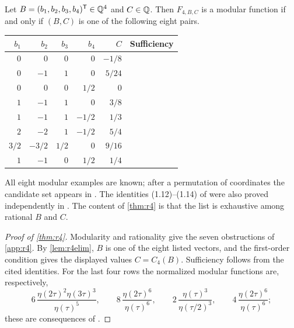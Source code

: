 \begin{theorem}\label{thm:r4}
Let $B=(b_1,b_2,b_3,b_4)^{\mathsf{T}}\in\mathbb{Q}^4$ and $C\in\mathbb{Q}$. Then $F_{4,B,C}$ is a modular function if and only if $(B,C)$ is one of the following eight pairs.
\begin{center}
\begin{tabular}{rrrrrl}
\toprule
$b_1$ & $b_2$ & $b_3$ & $b_4$ & $C$ & Sufficiency\\
\midrule
$0$ & $0$ & $0$ & $0$ & $-1/8$ & \cite[(1.20)]{SW26}\\
$0$ & $-1$ & $1$ & $0$ & $5/24$ & \cite[(1.21)]{SW26}\\
$0$ & $0$ & $0$ & $1/2$ & $0$ & \cite[(1.22)]{SW26}\\
$1$ & $-1$ & $1$ & $0$ & $3/8$ & \cite[(1.23)]{SW26}\\
$1$ & $-1$ & $1$ & $-1/2$ & $1/3$ & \cite[(1.10), Theorem~1.6]{SW26b}\\
$2$ & $-2$ & $1$ & $-1/2$ & $5/4$ & \cite[(1.12), Theorem~1.6]{SW26b}\\
$3/2$ & $-3/2$ & $1/2$ & $0$ & $9/16$ & \cite[(1.13), Theorem~1.6]{SW26b}\\
$1$ & $-1$ & $0$ & $1/2$ & $1/4$ & \cite[(1.14), Theorem~1.6]{SW26b}\\
\bottomrule
\end{tabular}
\end{center}
\end{theorem}

All eight modular examples are known; after a permutation of coordinates the candidate set appears in \cite[Table~3 and the subsequent discussion of $B_8'$]{CW25}. The identities (1.12)--(1.14) of \cite{SW26b} were also proved independently in \cite{Li26}. The content of \cref{thm:r4} is that the list is exhaustive among rational $B$ and $C$.

\begin{proof}[Proof of \cref{thm:r4}]
Modularity and rationality give the seven obstructions of \cref{app:r4}. By \cref{lem:r4elim}, $B$ is one of the eight listed vectors, and the first-order condition gives the displayed values $C=C_4(B)$. Sufficiency follows from the cited identities. For the last four rows the normalized modular functions are, respectively,
\[
6\,\frac{\eta(2\tau)^2\eta(3\tau)^3}{\eta(\tau)^5},\qquad 8\,\frac{\eta(2\tau)^6}{\eta(\tau)^6},\qquad 2\,\frac{\eta(\tau)^3}{\eta(\tau/2)^3},\qquad 4\,\frac{\eta(2\tau)^6}{\eta(\tau)^6};
\]
these are consequences of \cite[(1.10), (1.12)--(1.14), Theorem~1.6]{SW26b}.
\end{proof}

